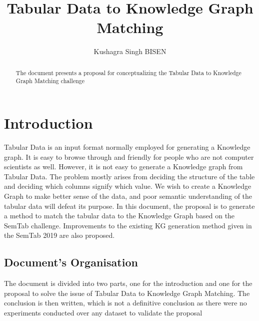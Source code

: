 \documentclass[runningheads]{llncs}
\begin{document}
%
\title{Tabular Data to Knowledge Graph Matching}
%
%
\author{Kushagra Singh BISEN}
%
%
%
\maketitle              %
%
\begin{abstract}
    The document presents a proposal for conceptualizing the Tabular Data to Knowledge Graph Matching challenge
    
\end{abstract}


\section{Introduction}

Tabular Data is an input format normally employed for generating a Knowledge graph. It is easy to browse through and friendly for people who are not computer scientists 
as well. However, it is not easy to generate a Knowledge graph from Tabular Data. The problem mostly arises from deciding the structure of the table and
deciding which columns signify which value. We wish to create a Knowledge Graph to make better sense of the data, and poor semantic understanding of the tabular
data will defeat its purpose. In this document, the proposal is to generate a method to match the tabular data to the Knowledge Graph based on the SemTab 
challenge. Improvements to the existing KG generation method given in the SemTab 2019 are also proposed.

\subsection{Document's Organisation}
The document is divided into two parts, one for the introduction and one for the proposal to solve the issue of Tabular Data to Knowledge Graph Matching. The 
conclusion is then written, which is not a definitive conclusion as there were no experiments conducted over any dataset to validate the proposal
\end{document}
